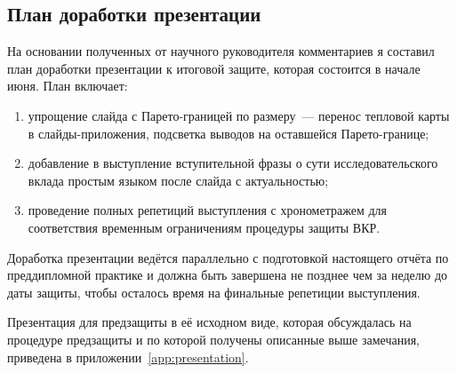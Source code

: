 \subsection{План доработки презентации}

На основании полученных от научного руководителя комментариев
я составил план доработки презентации к итоговой защите,
которая состоится в начале июня. План включает:

\begin{enumerate}
	\item упрощение слайда с Парето-границей по размеру~---
	      перенос тепловой карты в слайды-приложения, подсветка
	      выводов на оставшейся Парето-границе;
	\item добавление в выступление вступительной фразы о
	      сути исследовательского вклада простым языком после
	      слайда с актуальностью;
	\item проведение полных репетиций выступления с
	      хронометражем для соответствия временным ограничениям
	      процедуры защиты ВКР.
\end{enumerate}

Доработка презентации ведётся параллельно с подготовкой
настоящего отчёта по преддипломной практике и должна быть
завершена не позднее чем за неделю до даты защиты, чтобы
осталось время на финальные репетиции выступления.

Презентация для предзащиты в её исходном виде, которая
обсуждалась на процедуре предзащиты и по которой получены
описанные выше замечания, приведена в
приложении~\ref{app:presentation}.
